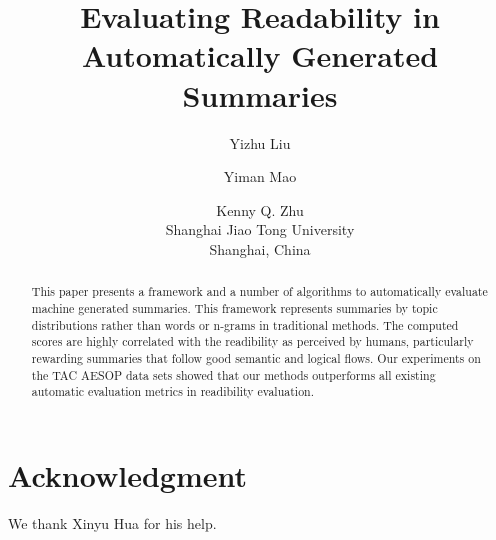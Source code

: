 \documentclass[letterpaper]{article}
\begin{document}
%
\title{Evaluating Readability in Automatically Generated Summaries}
\author{Yizhu Liu \and Yiman Mao \and Kenny Q. Zhu\\
Shanghai Jiao Tong University\\
Shanghai, China\\
}
\maketitle
\begin{abstract}
This paper presents a framework and a number of algorithms to automatically
evaluate machine generated summaries. This framework represents summaries by
topic distributions rather than words or n-grams in traditional methods.
The computed scores are highly correlated
with the readibility as perceived by humans, particularly rewarding summaries
that follow good semantic and logical flows. Our experiments on the TAC
AESOP data sets showed that our methods outperforms all existing automatic
evaluation metrics in readibility evaluation.
\end{abstract}








\section*{Acknowledgment}

We thank Xinyu Hua for his help.



\end{document}
